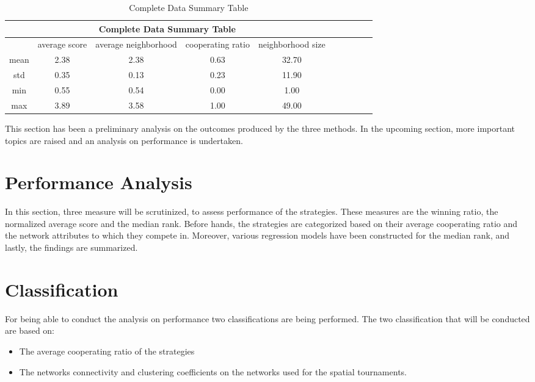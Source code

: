 \begin{table}[!hbtp]
	\centering
	\begin{adjustbox}{width=0.8\textwidth}
		\small
		\begin{tabular}{cccccccccc}
				\toprule
			\multicolumn{5}{|c|}{Complete Data Summary Table}                                      \\ \hline
			     & average score & average neighborhood & cooperating ratio & neighborhood size \\ \hline
			mean & 2.38          & 2.38                 & 0.63              & 32.70             \\ \hline
			std  & 0.35          & 0.13                 & 0.23              & 11.90             \\ \hline
			min  & 0.55          & 0.54                 & 0.00              & 1.00              \\ \hline
			max  & 3.89          & 3.58                 & 1.00              & 49.00             \\ \bottomrule
		\end{tabular}
	\end{adjustbox}
	\caption{Complete Data Summary Table}
	\label{table:summary-complete-data}
\end{table}

This section has been a preliminary analysis on the outcomes produced by
the three methods. In the upcoming section, more important topics are
raised and an analysis on performance is undertaken.

\section{Performance Analysis}
\label{performance-analysis}
In this section, three measure will be scrutinized, to assess performance of the
strategies. These measures are the winning ratio, the normalized average score
and the median rank. Before hands, the strategies are categorized based on their
average cooperating ratio and the network attributes to which they compete in. Moreover,
various regression models have been constructed for the median rank, and lastly,
the findings are summarized.

\section{Classification}
\label{sub:classification}
For being able to conduct the analysis on performance two classifications are
being performed. The two classification that will be conducted are based on:
\begin{itemize}
	\item The average cooperating ratio of the strategies
	\item The networks connectivity and clustering coefficients on the networks
	      used for the spatial tournaments.
\end{itemize}

